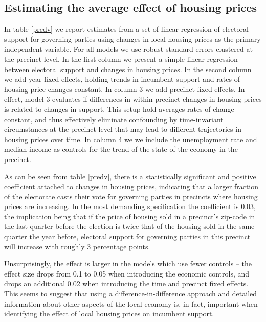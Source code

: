 \documentclass[12pt,a4paper]{article}
\begin{document}
\subsection{Estimating the average effect of housing prices}
In table \ref{predv}  we report estimates from a set of linear regression of electoral support for governing parties using changes in local housing prices as the primary independent variable. For all models we use robust standard errors clustered at the precinct-level. In the first column we present a simple linear regression between electoral support and changes in housing prices. In the second column we add year fixed effects, holding trends in incumbent support and rates of housing price changes constant. In column 3 we add precinct fixed effects. In effect, model 3 evaluates if differences in within-precinct changes in housing prices is related to changes in support. This setup hold averages rates of change constant, and thus effectively eliminate confounding by time-invariant circumstances at the precinct level that may lead to different trajectories in housing prices over time. In column 4 we we include the unemployment rate and median income as controls for the trend of the state of the economy in the precinct.






As can be seen from table \ref{predv}, there is a statistically significant and positive coefficient attached to changes in housing prices, indicating that a larger fraction of the electorate casts their vote for governing parties in precincts where housing prices are increasing. In the most demanding specification the coefficient is 0.03, the implication being that if the price of housing sold in a precinct's zip-code in the last quarter before the election is twice that of the housing sold in the same quarter the year before, electoral support for  governing parties in this precinct will increase with roughly 3 percentage points.

Unsurprisingly, the effect is larger in the models which use fewer controls --  the effect size drops from 0.1 to 0.05 when introducing the economic controls, and drops an additional 0.02 when introducing the time and precinct fixed effects. This seems to suggest that using a difference-in-difference approach and detailed information about other aspects of the local economy is, in fact, important when identifying the effect of local housing prices on incumbent support.
\end{document}
